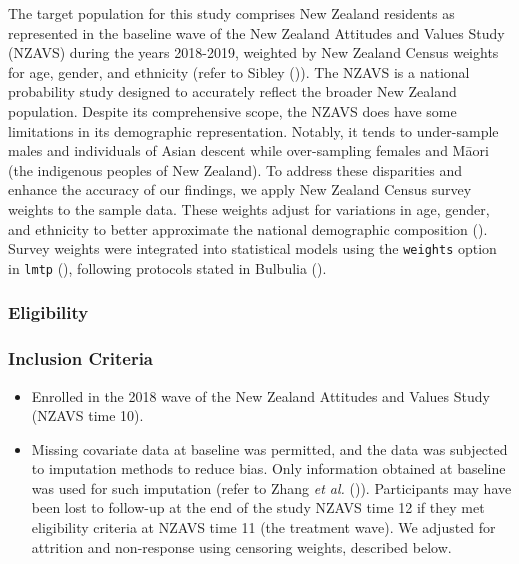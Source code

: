 \documentclass[
  single column]{article}
\providecommand{\tightlist}{%
  \setlength{\itemsep}{0pt}\setlength{\parskip}{0pt}}\usepackage{longtable,booktabs,array}
\begin{document}
The target population for this study comprises New Zealand residents as
represented in the baseline wave of the New Zealand Attitudes and Values
Study (NZAVS) during the years 2018-2019, weighted by New Zealand Census
weights for age, gender, and ethnicity (refer to Sibley
()). The NZAVS is a national probability
study designed to accurately reflect the broader New Zealand population.
Despite its comprehensive scope, the NZAVS does have some limitations in
its demographic representation. Notably, it tends to under-sample males
and individuals of Asian descent while over-sampling females and Māori
(the indigenous peoples of New Zealand). To address these disparities
and enhance the accuracy of our findings, we apply New Zealand Census
survey weights to the sample data. These weights adjust for variations
in age, gender, and ethnicity to better approximate the national
demographic composition (). Survey
weights were integrated into statistical models using the
\texttt{weights} option in \texttt{lmtp}
(), following
protocols stated in Bulbulia
().

\subsubsection{Eligibility}\label{eligibility}

\subsubsection{Inclusion Criteria}\label{inclusion-criteria}

\begin{itemize}
\tightlist
\item
  Enrolled in the 2018 wave of the New Zealand Attitudes and Values
  Study (NZAVS time 10).
\item
  Missing covariate data at baseline was permitted, and the data was
  subjected to imputation methods to reduce bias. Only information
  obtained at baseline was used for such imputation (refer to Zhang
  \emph{et al.}
  ()).
  Participants may have been lost to follow-up at the end of the study
  NZAVS time 12 if they met eligibility criteria at NZAVS time 11 (the
  treatment wave). We adjusted for attrition and non-response using
  censoring weights, described below.
\end{itemize}
\end{document}
